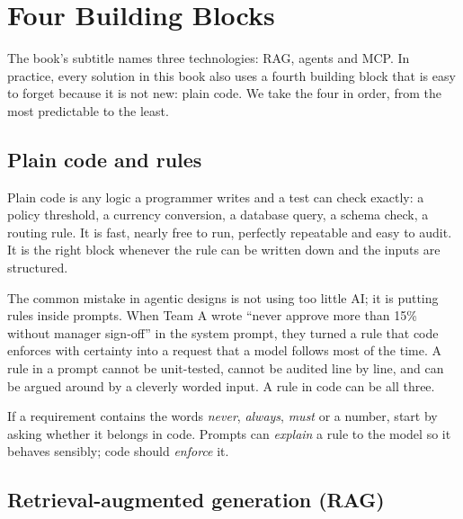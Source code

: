 
\section{Four Building Blocks}
\label{sec:blocks}

The book's subtitle names three technologies: RAG, agents and MCP. In practice, every solution in this book also uses a fourth building block that is easy to forget because it is not new: plain code. We take the four in order, from the most predictable to the least.

\subsection{Plain code and rules}
\label{sec:block-code}

Plain code is any logic a programmer writes and a test can check exactly: a policy threshold, a currency conversion, a database query, a schema check, a routing rule. It is fast, nearly free to run, perfectly repeatable and easy to audit. It is the right block whenever the rule can be written down and the inputs are structured.

The common mistake in agentic designs is not using too little AI; it is putting rules inside prompts. When Team A wrote ``never approve more than 15\% without manager sign-off'' in the system prompt, they turned a rule that code enforces with certainty into a request that a model follows most of the time. A rule in a prompt cannot be unit-tested, cannot be audited line by line, and can be argued around by a cleverly worded input. A rule in code can be all three.

\begin{designnote}
If a requirement contains the words \emph{never}, \emph{always}, \emph{must} or a number, start by asking whether it belongs in code. Prompts can \emph{explain} a rule to the model so it behaves sensibly; code should \emph{enforce} it.
\end{designnote}

\subsection{Retrieval-augmented generation (RAG)}
\label{sec:block-rag}

